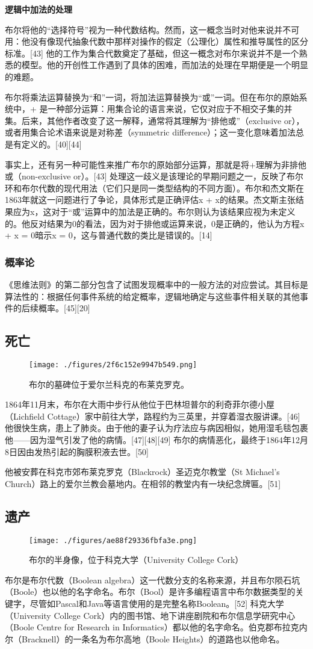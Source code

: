 \textbf{逻辑中加法的处理}  

布尔将他的“选择符号”视为一种代数结构。然而，这一概念当时对他来说并不可用：他没有像现代抽象代数中那样对操作的假定（公理化）属性和推导属性的区分标准。[43] 他的工作为集合代数奠定了基础，但这一概念对布尔来说并不是一个熟悉的模型。他的开创性工作遇到了具体的困难，而加法的处理在早期便是一个明显的难题。

布尔将乘法运算替换为“和”一词，将加法运算替换为“或”一词。但在布尔的原始系统中，+ 是一种部分运算：用集合论的语言来说，它仅对应于不相交子集的并集。后来，其他作者改变了这一解释，通常将其理解为“排他或”（exclusive or），或者用集合论术语来说是对称差（symmetric difference）；这一变化意味着加法总是有定义的。[40][44]

事实上，还有另一种可能性来推广布尔的原始部分运算，那就是将+理解为非排他或（non-exclusive or）。[43] 处理这一歧义是该理论的早期问题之一，反映了布尔环和布尔代数的现代用法（它们只是同一类型结构的不同方面）。布尔和杰文斯在1863年就这一问题进行了争论，具体形式是正确评估x + x的结果。杰文斯主张结果应为x，这对于“或”运算中的加法是正确的。布尔则认为该结果应视为未定义的。他反对结果为0的看法，因为对于排他或运算来说，0是正确的，他认为方程x + x = 0暗示x = 0，这与普通代数的类比是错误的。[14]
\subsubsection{概率论}  
《思维法则》的第二部分包含了试图发现概率中的一般方法的对应尝试。其目标是算法性的：根据任何事件系统的给定概率，逻辑地确定与这些事件相关联的其他事件的后续概率。[45][20]
\subsection{死亡}
\begin{figure}[ht]
\centering
\texttt{[image: ./figures/2f6c152e9947b549.png]}
\caption{布尔的墓碑位于爱尔兰科克的布莱克罗克。} \label{fig_George_9}
\end{figure}
1864年11月末，布尔在大雨中步行从他位于巴林坦普尔的利奇菲尔德小屋（Lichfield Cottage）家中前往大学，路程约为三英里，并穿着湿衣服讲课。[46] 他很快生病，患上了肺炎。由于他的妻子认为疗法应与病因相似，她用湿毛毯包裹他——因为湿气引发了他的病情。[47][48][49] 布尔的病情恶化，最终于1864年12月8日因由发热引起的胸膜积液去世。[50]

他被安葬在科克市郊布莱克罗克（Blackrock）圣迈克尔教堂（St Michael's Church）路上的爱尔兰教会墓地内。在相邻的教堂内有一块纪念牌匾。[51]
\subsection{遗产}
\begin{figure}[ht]
\centering
\texttt{[image: ./figures/ae88f29336fbfa3e.png]}
\caption{布尔的半身像，位于科克大学（University College Cork）} \label{fig_George_8}
\end{figure}
布尔是布尔代数（Boolean algebra）这一代数分支的名称来源，并且布尔陨石坑（Boole）也以他的名字命名。布尔（Bool）是许多编程语言中布尔数据类型的关键字，尽管如Pascal和Java等语言使用的是完整名称Boolean。[52] 科克大学（University College Cork）内的图书馆、地下讲座剧院和布尔信息学研究中心（Boole Centre for Research in Informatics）都以他的名字命名。伯克郡布拉克内尔（Bracknell）的一条名为布尔高地（Boole Heights）的道路也以他命名。
